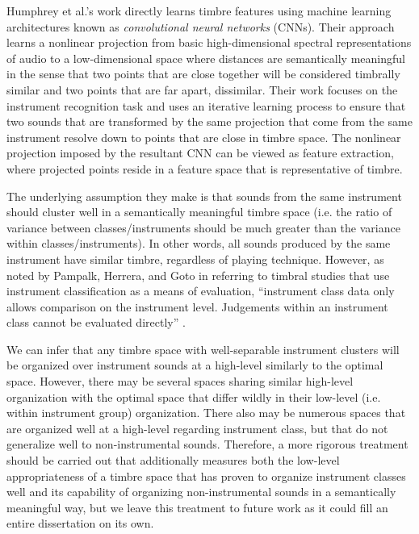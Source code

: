 \documentclass[12pt]{report} 	%
\numberwithin{figure}{chapter}
\numberwithin{table}{chapter}
\numberwithin{equation}{chapter}
\begin{document}
\begin{flushleft}
Humphrey et al.'s \cite{Humphrey:2000th} work directly learns timbre features using machine learning architectures known as  \textit{convolutional neural networks} (CNNs). Their approach learns a nonlinear projection from basic high-dimensional spectral representations of audio to a low-dimensional space where distances are semantically meaningful in the sense that two points that are close together will be considered timbrally similar and two points that are far apart, dissimilar. Their work focuses on the instrument recognition task and uses an iterative learning process to ensure that two sounds that are transformed by the same projection that come from the same instrument resolve down to points that are close in timbre space. The nonlinear projection imposed by the resultant CNN can be viewed as feature extraction, where projected points reside in a feature space that is representative of timbre.

The underlying assumption they make is that sounds from the same instrument should cluster well in a semantically meaningful timbre space (i.e. the ratio of variance between classes/instruments should be much greater than the variance within classes/instruments). In other words, all sounds produced by the same instrument have similar timbre, regardless of playing technique. However, as noted by Pampalk, Herrera, and Goto in referring to timbral studies that use instrument classification as a means of evaluation, ``instrument class data only allows comparison on the instrument level. Judgements within an instrument class cannot be evaluated directly'' \cite[p. 9]{Pampalk:2008xz}. 

We can infer that any timbre space with well-separable instrument clusters will be organized over instrument sounds at a high-level similarly to the optimal space. However, there may be several spaces sharing similar high-level organization with the optimal space that differ wildly in their low-level (i.e. within instrument group) organization. There also may be numerous spaces that are organized well at a high-level regarding instrument class, but that do not generalize well to non-instrumental sounds. Therefore, a more rigorous treatment should be carried out that additionally measures both the low-level appropriateness of a timbre space that has proven to organize instrument classes well and its capability of organizing non-instrumental sounds in a semantically meaningful way, but we leave this treatment to future work as it could fill an entire dissertation on its own.


\end{flushleft}
\end{document}
